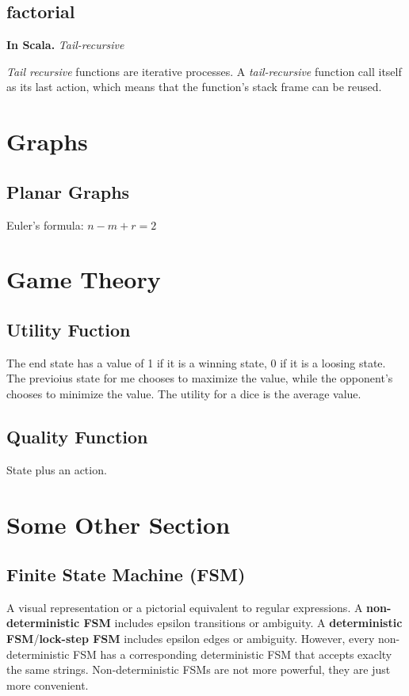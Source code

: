 \documentclass[12pt]{article}
\begin{document}
\subsection{factorial}

\textbf{In Scala.} \textit{Tail-recursive}

\textit{Tail recursive} functions are iterative processes. A \textit{tail-recursive} function call itself as its last action, which means that the function's stack frame can be reused.




\section{Graphs}

\subsection{Planar Graphs}

Euler's formula: $n
-m+r=2$


\section{Game Theory}

\subsection{Utility Fuction}

The end state has a value of 1 if it is a winning state, 0 if it is a loosing state. The previoius state for me chooses to maximize the value, while the opponent's chooses to minimize the value. The utility for a dice is the average value.

\subsection{Quality Function}

State plus an action.



\section{Some Other Section}

\subsection*{Finite State Machine (FSM)}
A visual representation or a pictorial equivalent to regular expressions. A \textbf{non-deterministic FSM} includes epsilon transitions or ambiguity. 
A \textbf{deterministic FSM}/\textbf{lock-step FSM} includes  epsilon edges or ambiguity. However, every non-deterministic FSM has a corresponding deterministic FSM that accepts exaclty the same strings. Non-deterministic FSMs are not more powerful, they are just more convenient.
\end{document}

